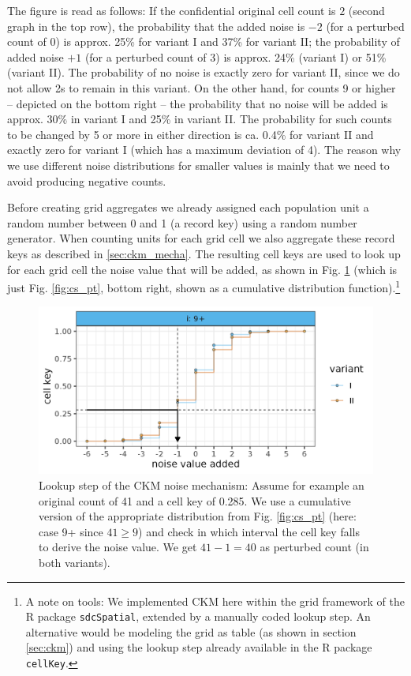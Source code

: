 The figure is read as follows: If the confidential original cell count is $2$ (second graph in the top row), the probability that the added noise is $-2$ (for a perturbed count of 0) is approx. 25\% for variant I and 37\% for variant II; the probability of added noise $+1$ (for a perturbed count of 3) is approx. 24\% (variant I) or 51\% (variant II). The probability of no noise is exactly zero for variant II, since we do not allow 2s to remain in this variant. 
On the other hand, for counts 9 or higher -- depicted on the bottom right -- the probability that no noise will be added is approx. 30\% in variant I and 25\% in variant II. The probability for such counts to be changed by 5 or more in either direction is ca. 0.4\% for variant II and exactly zero for variant I (which has a maximum deviation of 4). The reason why we use different noise distributions for smaller values is mainly that we need to avoid producing negative counts.

Before creating grid aggregates we already assigned each population unit a random number between 0 and 1 (a record key) using a random number generator. When counting units for each grid cell we also aggregate these record keys as described in \ref{sec:ckm_mecha}. The resulting cell keys are used to look up for each grid cell the noise value that will be added, as shown in Fig. \ref{fig:cs_lu} (which is just Fig. \ref{fig:cs_pt}, bottom right, shown as a cumulative distribution function).\footnote{
     A note on tools: We implemented CKM here within the grid framework of the R package \texttt{sdcSpatial}, extended by a manually coded lookup step. An alternative would be modeling the grid as table (as shown in section \ref{sec:ckm}) and using the lookup step already available in the R package \texttt{cellKey}.}

\begin{figure}[H]
    \centering
    \includegraphics[width=\linewidth]{figures/CaseStudy_CKM/lookup_castestudy.png}
    \caption{Lookup step of the CKM noise mechanism: Assume for example an original count of 41 and a cell key of 0.285. We use a cumulative version of the appropriate distribution from Fig. \ref{fig:cs_pt} (here: case 9+ since $41 \geq 9$) and check in which interval the cell key falls to derive the noise value. We get $41 - 1 = 40$ as perturbed count (in both variants).}
    \label{fig:cs_lu}
\end{figure}

